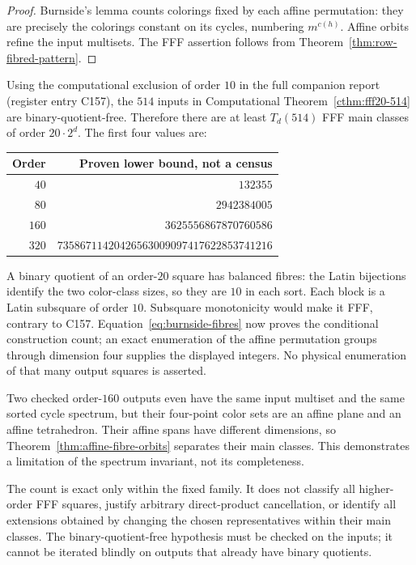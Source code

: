 \begin{proof}
Burnside's lemma counts colorings fixed by each affine permutation:
they are precisely the colorings constant on its cycles, numbering
$m^{c(h)}$. Affine orbits refine the input multisets. The FFF
assertion follows from Theorem~\ref{thm:row-fibred-pattern}.
\end{proof}

\begin{computationaltheorem}
\label{cthm:dyadic-fff20-bound}
Using the computational exclusion of order $10$ in the full companion
report (register entry C157), the $514$ inputs in Computational
Theorem~\ref{cthm:fff20-514} are binary-quotient-free. Therefore
there are at least $T_d(514)$ FFF main classes of order $20\cdot2^d$.
The first four values are:
\begin{center}
\begin{tabular}{rr}
\toprule
Order & Proven lower bound, not a census\\
\midrule
$40$ & $132355$\\
$80$ & $2942384005$\\
$160$ & $3625556867870760586$\\
$320$ & $73586711420426563009097417622853741216$\\
\bottomrule
\end{tabular}
\end{center}
\end{computationaltheorem}

A binary quotient of an order-$20$ square has balanced fibres:
the Latin bijections identify the two color-class sizes, so they
are $10$ in each sort. Each block is a Latin subsquare of order
$10$. Subsquare monotonicity would make it FFF, contrary to C157.
Equation~\eqref{eq:burnside-fibres} now proves the conditional
construction count; an exact enumeration of the affine permutation
groups through dimension four supplies the displayed integers.
No physical enumeration of that many output squares is asserted.

Two checked order-$160$ outputs even have the same input multiset
and the same sorted cycle spectrum, but their four-point color sets
are an affine plane and an affine tetrahedron. Their affine spans
have different dimensions, so Theorem~\ref{thm:affine-fibre-orbits}
separates their main classes. This demonstrates a limitation of
the spectrum invariant, not its completeness.

The count is exact only within the fixed family. It does not
classify all higher-order FFF squares, justify arbitrary
direct-product cancellation, or identify all extensions obtained
by changing the chosen representatives within their main classes.
The binary-quotient-free hypothesis must be checked on the inputs;
it cannot be iterated blindly on outputs that already have binary quotients.
